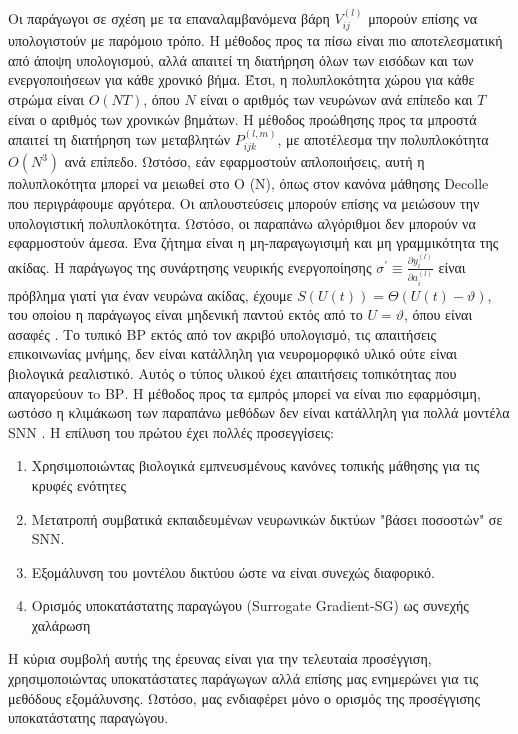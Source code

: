 \documentclass[12pt]{report}
\begin{document}
Οι παράγωγοι σε σχέση με τα επαναλαμβανόμενα βάρη $V_{i j}^{(l)}$ μπορούν επίσης να υπολογιστούν με παρόμοιο τρόπο. Η μέθοδος προς τα πίσω είναι πιο αποτελεσματική από άποψη υπολογισμού, αλλά απαιτεί τη διατήρηση όλων των εισόδων και των ενεργοποιήσεων για κάθε χρονικό βήμα. Έτσι, η πολυπλοκότητα χώρου για κάθε στρώμα είναι $O(N T)$, όπου $N$ είναι ο αριθμός των νευρώνων ανά επίπεδο και $T$ είναι ο αριθμός των χρονικών βημάτων. Η μέθοδος προώθησης προς τα μπροστά απαιτεί τη διατήρηση των μεταβλητών $P_{i j k}^{(l, m)}$, με αποτέλεσμα την πολυπλοκότητα $O\left(N^{3}\right)$ ανά επίπεδο. Ωστόσο, εάν εφαρμοστούν απλοποιήσεις, αυτή η πολυπλοκότητα μπορεί να μειωθεί στο O (N), όπως στον κανόνα μάθησης \textlatin{Decolle} που περιγράφουμε αργότερα. Οι απλουστεύσεις μπορούν επίσης να μειώσουν την υπολογιστική πολυπλοκότητα.
Ωστόσο, οι παραπάνω αλγόριθμοι δεν μπορούν να εφαρμοστούν άμεσα. Ένα ζήτημα είναι η μη-παραγωγισιμή και μη γραμμικότητα της ακίδας. Η παράγωγος της συνάρτησης νευρικής ενεργοποίησης $\sigma^{\prime} \equiv \frac{\partial y_{i}^{(l)}}{\partial a_{i}^{(l)}}$ είναι  πρόβλημα γιατί για έναν νευρώνα ακίδας, έχουμε $S(U(t))=\Theta(U(t)-\vartheta)$, του οποίου η παράγωγος είναι μηδενική παντού εκτός από το $U=\vartheta$, όπου είναι ασαφές . Το τυπικό \textlatin{BP} εκτός από τον ακριβό υπολογισμό, τις απαιτήσεις επικοινωνίας μνήμης, δεν είναι κατάλληλη για νευρομορφικό υλικό ούτε είναι βιολογικά ρεαλιστικό. Αυτός ο τύπος υλικού έχει απαιτήσεις τοπικότητας που απαγορεύουν τo \textlatin{BP}. Η μέθοδος προς τα εμπρός μπορεί να είναι πιο εφαρμόσιμη, ωστόσο η κλιμάκωση των παραπάνω μεθόδων δεν είναι κατάλληλη για πολλά μοντέλα \textlatin{SNN} .
Η επίλυση του πρώτου έχει πολλές προσεγγίσεις:

\begin{enumerate}
\item Χρησιμοποιώντας βιολογικά εμπνευσμένους κανόνες τοπικής μάθησης για τις κρυφές ενότητες
\item Μετατροπή συμβατικά εκπαιδευμένων νευρωνικών δικτύων "βάσει ποσοστών" σε \textlatin{SNN}.
\item Εξομάλυνση του μοντέλου δικτύου ώστε να είναι συνεχώς διαφορικό.
\item Ορισμός υποκατάστατης παραγώγου (\textlatin{Surrogate Gradient}-\textlatin{SG}) ως συνεχής χαλάρωση
\end{enumerate}

Η κύρια συμβολή αυτής της έρευνας είναι για την τελευταία προσέγγιση, χρησιμοποιώντας υποκατάστατες παράγωγων αλλά επίσης μας ενημερώνει για τις μεθόδους εξομάλυνσης. Ωστόσο, μας ενδιαφέρει μόνο ο ορισμός της προσέγγισης υποκατάστατης παραγώγου.
\end{document}
